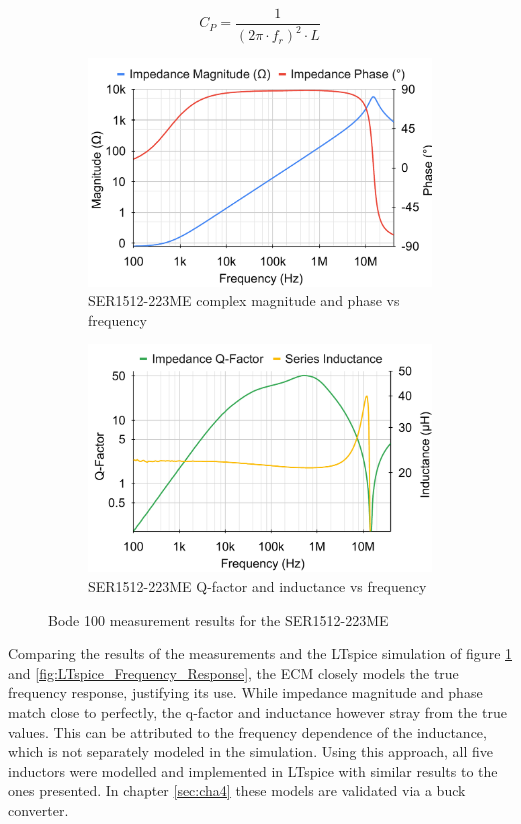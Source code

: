 \begin{equation}\label{eq:ecm_capacitance}
    C_P = \frac{1}{\left(2 \pi \cdot f_r\right)^2\cdot L}
\end{equation}
\begin{figure}[H]
    \begin{subfigure}[b]{0.50\textwidth}
        \includegraphics[width=\textwidth]{Bilder/Kapitel3/SER223_BodePlot.pdf}
        \caption{SER1512-223ME complex magnitude and phase vs frequency}
    \end{subfigure}
    \begin{subfigure}[b]{0.50\textwidth}
        \includegraphics[width=\textwidth]{Bilder/Kapitel3/SER223_QLPlot.pdf}
        \caption{SER1512-223ME Q-factor and inductance vs frequency}
    \end{subfigure}
    \caption{Bode 100 measurement results for the SER1512-223ME}
    \label{fig:bode_100_measurements}							
\end{figure}
Comparing the results of the measurements and the LTspice simulation of figure \ref{fig:bode_100_measurements} and \ref{fig:LTspice_Frequency_Response}, the \ac{ECM} closely models the true frequency response, justifying its use. While impedance magnitude and phase match close to perfectly, the q-factor and inductance however stray from the true values. This can be attributed to the frequency dependence of the inductance, which is not separately modeled in the simulation. 
Using this approach, all five inductors were modelled and implemented in LTspice with similar results to the ones presented. In chapter \ref{sec:cha4} these models are validated via a buck converter.

